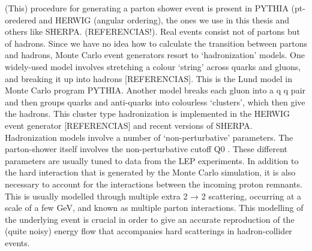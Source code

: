 (This) procedure for generating a parton shower event is present in PYTHIA (pt-oredered and HERWIG (angular ordering), the ones we use in this thesis and others like SHERPA. (REFERENCIAS!). 
Real events consist not of partons but of hadrons. Since we have no idea how to calculate the transition between partons and hadrons, Monte Carlo event generators resort to ‘hadronization’ models. One widely-used model involves stretching a colour ‘string’ across quarks and gluons, and breaking it up into hadrons [REFERENCIAS]. This is the Lund model  in Monte Carlo program PYTHIA.
Another model breaks each gluon into a q q pair and then groups quarks and anti-quarks into colourless ‘clusters’, which then give the hadrons. This cluster type hadronization is implemented in the HERWIG event generator [REFERENCIAS] and recent versions of SHERPA.
Hadronization models involve a number of ‘non-perturbative’ parameters. The parton-shower
itself involves the non-perturbative cutoff Q0 . These different parameters are usually tuned to data from
the LEP experiments.
In addition to the hard interaction that is generated by the Monte Carlo
simulation, it is also necessary to account for the interactions between the incoming proton 
remnants. This is usually modelled through multiple extra 2 → 2 scattering, occurring at a scale of a
few GeV, and known as multiple parton interactions. This modelling of the underlying event is crucial in
order to give an accurate reproduction of the (quite noisy) energy flow that accompanies hard scatterings
in hadron-collider events.

